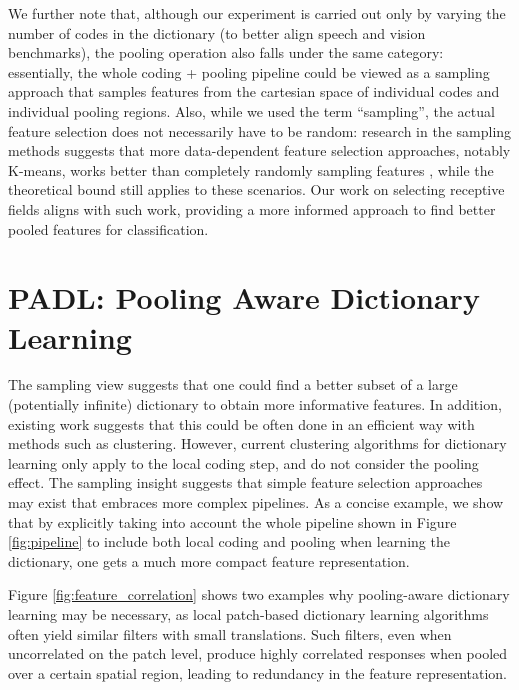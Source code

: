 We further note that, although our experiment is carried out only by varying the number of codes in the dictionary (to better align speech and vision benchmarks), the pooling operation also falls under the same category: essentially, the whole coding + pooling pipeline could be viewed as a \nystrom sampling approach that samples features from the cartesian space of individual codes and individual pooling regions. Also, while we used the term ``sampling'', the actual feature selection does not necessarily have to be random: research in the \nystrom sampling methods suggests that more data-dependent feature selection approaches, notably K-means, works better than completely randomly sampling features \cite{zhang2008improved,kumar2012sampling}, while the theoretical bound still applies to these scenarios. Our work on selecting receptive fields aligns with such work, providing a more informed approach to find better pooled features for classification.

\section{PADL: Pooling Aware Dictionary Learning}\label{sec:sizematters:algorithm}

The \nystrom sampling view suggests that one could find a better subset of a large (potentially infinite) dictionary to obtain more informative features. In addition, existing work suggests that this could be often done in an efficient way with methods such as clustering. However, current clustering algorithms for dictionary learning \cite{coates2010aistats,coates2011icml} only apply to the local coding step, and do not consider the pooling effect. The \nystrom sampling insight suggests that simple feature selection approaches may exist that embraces more complex pipelines. As a concise example, we show that by explicitly taking into account the whole pipeline shown in Figure \ref{fig:pipeline} to include both local coding and pooling when learning the dictionary, one gets a much more compact feature representation.

Figure \ref{fig:feature_correlation} shows two examples why pooling-aware dictionary learning may be necessary, as local patch-based dictionary learning algorithms often yield similar filters with small translations. Such filters, even when uncorrelated on the patch level, produce highly correlated responses when pooled over a certain spatial region, leading to redundancy in the feature representation.

